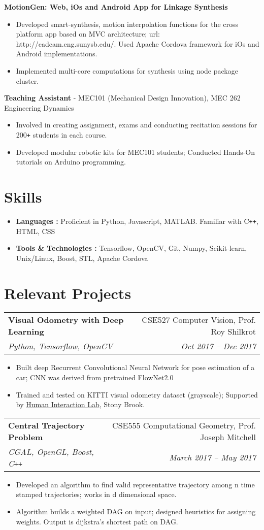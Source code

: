 \documentclass[letterpaper,10pt]{article}
\makeatletter
\newcommand{\resumeHeading}[4]{
  \vspace{-1pt}
    \begin{tabular*}{0.97\textwidth}{l@{\extracolsep{\fill}}r}
      \textbf{#1} & #2 \vspace{-2pt}\\ \vspace{1pt}
      \textit{\small#3} & \textit{\small #4} \\
    \end{tabular*}
}
\newcommand{\resumeSubheading}[1]{
      {\small\textbf{#1}} \\
}
\newcommand{\resumeSubheadingNew}[1]{
      {\small{#1}} \\
}
\newcommand{\resumeSection}[1]{
\vspace{-12pt}
\section{\textbf{#1}}
}
\newcommand{\resumeItemListStart}{
\vspace{-7pt}
\begin{itemize}[leftmargin=14pt]
}
\newcommand{\resumeItemListEnd}{
\vspace{+7pt}
\end{itemize}
}
\newcommand{\resumeItem}[1]{
  \item\small{
      {#1 \vspace{-7pt}
      }
  }
}
\makeatother
\begin{document}
      \vspace{-5pt}
      \resumeSubheading{MotionGen: Web, iOs and Android App for Linkage Synthesis}
      \resumeItemListStart
        \resumeItem{Developed smart-synthesis, motion interpolation functions for the cross platform app based on MVC architecture; url: http://cadcam.eng.sunysb.edu/. Used Apache Cordova framework for iOs and Android implementations.}
        \resumeItem{Implemented multi-core computations for synthesis using node package cluster.}
      \resumeItemListEnd

      \vspace{-5pt}
      \resumeSubheadingNew{\textbf{Teaching Assistant} - MEC101 (Mechanical Design Innovation), MEC 262 Engineering Dynamics}
      \resumeItemListStart
        \resumeItem{Involved in creating assignment, exams and conducting recitation sessions for 200\texttt{+} students in each course.}
        \resumeItem{Developed modular robotic kits for MEC101 students; Conducted Hands-On tutorials on Arduino programming.}
      \resumeItemListEnd

\resumeSection{Skills}
\vspace{+7pt}
    \resumeItemListStart
      \resumeItem{\textbf{Languages :} Proficient in Python, Javascript, MATLAB. Familiar with C\texttt{++}, HTML, CSS}
      \resumeItem{\textbf{Tools \& Technologies :} Tensorflow, OpenCV, Git, Numpy, Scikit-learn, Unix/Linux, Boost, STL, Apache Cordova}
    \resumeItemListEnd


\resumeSection{Relevant Projects}
    \resumeHeading{Visual Odometry with Deep Learning}{CSE527 Computer Vision, Prof. Roy Shilkrot} {Python, Tensorflow, OpenCV}{Oct 2017 -- Dec 2017}
    \resumeItemListStart
      \resumeItem{Built deep Recurrent Convolutional Neural Network for pose estimation of a car; CNN was derived from pretrained FlowNet2.0}
      \resumeItem{Trained and tested on KITTI visual odometry dataset (grayscale); Supported by \href{http://hi.cs.stonybrook.edu/}{Human Interaction Lab}, Stony Brook.}
    \resumeItemListEnd

    \resumeHeading{Central Trajectory Problem}{CSE555 Computational Geometry, Prof. Joseph Mitchell}{CGAL, OpenGL, Boost, C\texttt{++}}{March 2017 -- May 2017}
    \resumeItemListStart
      \resumeItem{Developed an algorithm to find valid representative trajectory among n time stamped trajectories; works in d dimensional space.}
      \resumeItem{Algorithm builds a weighted DAG on input; designed heuristics for assigning weights. Output is dijkstra's shortest path on DAG.}
    \resumeItemListEnd
\end{document}
